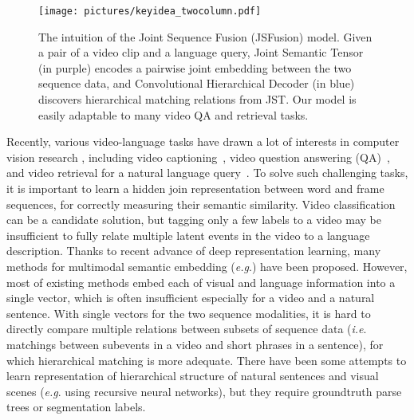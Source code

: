 \documentclass[runningheads]{llncs}
\makeatletter
\DeclareRobustCommand\onedot{\futurelet\@let@token\@onedot}
\def\onedot{.\@\xspace}
\def\eg{\textit{e.g}\onedot} \def\Eg{\textit{E.g}\onedot}
\def\ie{\textit{i.e}\onedot} \def\Ie{\textit{I.e}\onedot}
\makeatother
\begin{document}
\begin{figure*}[t]
\centering
\texttt{[image: pictures/keyidea\_twocolumn.pdf]}
\caption{The intuition of the Joint Sequence Fusion (JSFusion) model. 
Given a pair of a video clip and a language query, 
Joint Semantic Tensor (in purple) encodes a pairwise joint embedding between the two sequence data, 
and Convolutional Hierarchical Decoder (in blue) discovers hierarchical matching relations from JST. 
Our model is easily adaptable to many video QA and retrieval tasks.
}

\label{fig:keyidea}
\end{figure*}


Recently, various video-language tasks have drawn a lot of interests in computer vision research \cite{rohrbach-arxiv-2016,xu-CVPR-2016,chen-acl-2011}, including video captioning~\cite{jeff-cvpr-2015,guadarrama-iccv-2013,rohrbach-gcpr-2015,venugopalan-iccv-2015,xu-aaai-2015,yu-cvpr-2017}, video question answering (QA)~\cite{tapaswi-cvpr-2016,jang-CVPR-2017}, and video retrieval for a natural language query~\cite{xu-aaai-2015,torabi-arxiv-2016,mayu-arxiv-2016}. 
To solve such challenging tasks, it is important to learn a hidden join representation between word and frame sequences, for correctly measuring their semantic similarity. 
Video classification \cite{laptev-iccv-2003,laptev-cvpr-2008,soomro-crcv-2012,karpathy-CVPR-2014,caba-cvpr-2015} can be  a candidate solution, 
but tagging only a few labels to a video may be insufficient to fully relate multiple latent events in the video to a language description. Thanks to recent advance of deep representation learning, many methods for multimodal semantic embedding (\eg \cite{kiros-tacl-2014,frome-nips-2013,socher-tacl-2014}) have been proposed.
However, most of existing methods embed each of visual and language information into a single vector,
which is often insufficient especially for a video and a natural sentence. 
With single vectors for the two sequence modalities, it is hard to directly compare multiple relations between subsets of sequence data (\ie matchings between subevents in a video and short phrases in a sentence),
for which hierarchical matching is more adequate. There have been some attempts to learn representation of hierarchical structure of natural sentences and visual scenes (\eg \cite{socher-icml-2011,socher-acl-2013} using recursive neural networks), but they require groundtruth parse trees or segmentation labels.
\end{document}
